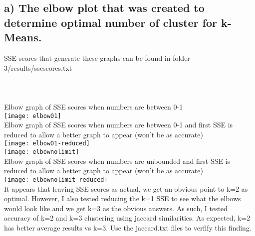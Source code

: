 \subsection*{a) The elbow plot that was created to determine optimal number of cluster for k-Means.}
SSE scores that generate these graphs can be found in folder 3/results/ssescores.txt
\\
\\
\\
\\
Elbow graph of SSE scores when numbers are between 0-1
\\
\texttt{[image: elbow01]}
\\
Elbow graph of SSE scores when numbers are between 0-1 and first SSE is reduced to allow a better graph to appear (won't be as accurate)
\\
\texttt{[image: elbow01-reduced]}
\\
\texttt{[image: elbownolimit]}
\\
Elbow graph of SSE scores when numbers are unbounded and first SSE is reduced to allow a better graph to appear (won't be as accurate)
\\
\texttt{[image: elbownolimit-reduced]}
\\
It appears that leaving SSE scores as actual, we get an obvious point to k=2 as optimal. However, I also tested reducing the k=1 SSE to see what the elbows would look like and we get k=3 as the obvious answers. As such, I tested accuracy of k=2 and k=3 clustering using jaccard similarities. As expected, k=2 has better average results vs k=3. Use the jaccard.txt files to verfify this finding. 

